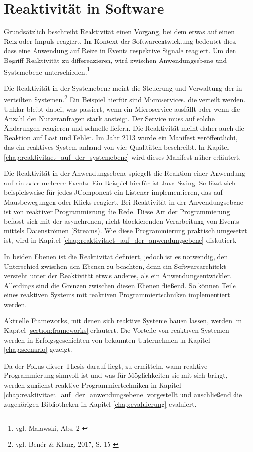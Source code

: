 \chapter{Reaktivität in Software}
\label{chap:reaktivitaet_in_software}
Grundsätzlich beschreibt Reaktivität einen Vorgang, bei dem etwas auf einen Reiz oder Impuls reagiert. Im Kontext der Softwareentwicklung bedeutet dies, dass eine Anwendung auf Reize in Events respektive Signale reagiert. 
Um den Begriff Reaktivität zu differenzieren, wird zwischen Anwendungsebene und Systemebene unterschieden.\footnote{vgl. Malawski, Abs. 2 \cite{buch:why_reactive:kapitel1} \label{yr}}

Die Reaktivität in der Systemebene meint die Steuerung und Verwaltung der  in verteilten Systemen.\footnote{vgl. Bonér \& Klang, 2017, S. 15 \cite{technischer_bericht:lightbend:rpvsrs} \label{rpvsrs}} Ein Beispiel hierfür sind Microservices, die verteilt werden. Unklar bleibt dabei, was passiert, wenn ein Microservice ausfällt oder wenn die Anzahl der Nutzeranfragen stark ansteigt. Der Service muss auf solche Änderungen reagieren und schnelle  liefern. Die Reaktivität meint daher auch die Reaktion auf Last und Fehler. Im Jahr 2013 wurde ein Manifest veröffentlicht, das ein reaktives System anhand von vier Qualitäten beschreibt. In Kapitel \ref{chap:reaktivitaet_auf_der_systemebene} wird dieses Manifest näher erläutert.

Die Reaktivität in der Anwendungsebene spiegelt die Reaktion einer Anwendung auf ein oder mehrere Events. Ein Beispiel hierfür ist Java Swing. So lässt sich beispielsweise für jedes JComponent ein Listener implementieren, das auf Mausbewegungen oder Klicks reagiert. Bei Reaktivität in der Anwendungsebene ist von reaktiver Programmierung die Rede. Diese Art der Programmierung befasst sich mit der asynchronen, nicht blockierenden Verarbeitung von Events mittels Datenströmen (Streams). Wie diese Programmierung praktisch umgesetzt ist, wird in Kapitel \ref{chap:reaktivitaet_auf_der_anwendungsebene} diskutiert.

In beiden Ebenen ist die Reaktivität definiert, jedoch ist es notwendig, den Unterschied zwischen den Ebenen zu beachten, denn ein Softwarearchitekt versteht unter der Reaktivität etwas anderes, als ein Anwendungsentwickler. Allerdings sind die Grenzen zwischen diesen Ebenen fließend. So können Teile eines reaktiven Systems mit reaktiven Programmiertechniken implementiert werden.

Aktuelle Frameworks, mit denen sich reaktive Systeme bauen lassen, werden im Kapitel \ref{section:frameworks} erläutert. Die Vorteile von reaktiven Systemen werden in Erfolgsgeschichten von bekannten Unternehmen in Kapitel \ref{chap:scenario} gezeigt. 

Da der Fokus dieser Thesis darauf liegt, zu ermitteln, wann reaktive Programmierung sinnvoll ist und was für Möglichkeiten sie mit sich bringt, werden zunächst reaktive Programmiertechniken in Kapitel \ref{chap:reaktivitaet_auf_der_anwendungsebene} vorgestellt und anschließend die zugehörigen Bibliotheken in Kapitel \ref{chap:evaluierung} evaluiert. 